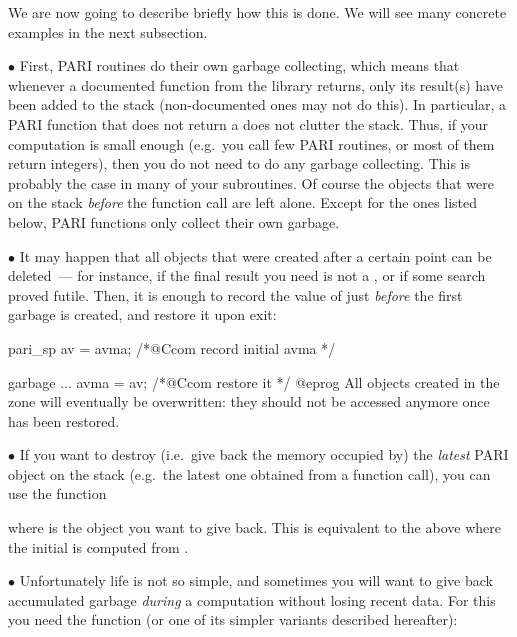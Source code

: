 We are now going to describe briefly how this is done. We will see many
concrete examples in the next subsection.

\noindent$\bullet$
First, PARI routines do their own garbage collecting, which means that
whenever a documented function from the library returns, only its result(s)
have been added to the stack (non-documented ones may not do this). In
particular, a PARI function that does not return a  does not clutter
the stack. Thus, if your computation is small enough (e.g.~you call few PARI
routines, or most of them return  integers), then you do not need
to do any garbage collecting. This is probably the case in many of your
subroutines. Of course the objects that were on the stack \emph{before} the
function call are left alone. Except for the ones listed below, PARI
functions only collect their own garbage.

\noindent$\bullet$
It may happen that all objects that were created after a certain point can
be deleted~--- for instance, if the final result you need is not a
, or if some search proved futile. Then, it is enough to record
the value of  just \emph{before} the first garbage is created,
and restore it upon exit:

\bprog
pari_sp av = avma; /*@Ccom record initial avma */

garbage ...
avma = av; /*@Ccom restore it */
@eprog
\noindent All objects created in the  zone will eventually
be overwritten: they should not be accessed anymore once  has been
restored.

\noindent$\bullet$
If you want to destroy (i.e.~give back the memory occupied by) the
\emph{latest} PARI object on the stack (e.g.~the latest one obtained from a
function call), you can use the function%


\noindent where  is the object you want to give back. This is
equivalent to the above where the initial  is computed from .

\noindent$\bullet$
Unfortunately life is not so simple, and sometimes you will want
to give back accumulated garbage \emph{during} a computation without losing
recent data. For this you need the  function (or one of its
simpler variants described hereafter):



